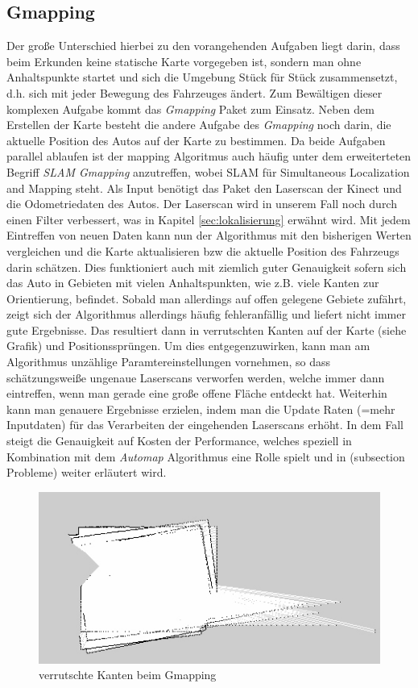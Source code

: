 \subsection{Gmapping}
\label{subsec:gmapping}
Der große Unterschied hierbei zu den vorangehenden Aufgaben liegt darin, dass beim Erkunden keine statische Karte vorgegeben ist, sondern man ohne Anhaltspunkte startet und sich die Umgebung Stück für Stück zusammensetzt, d.h. sich mit jeder Bewegung des Fahrzeuges ändert. Zum Bewältigen dieser komplexen Aufgabe kommt das \textit{Gmapping} Paket zum Einsatz. Neben dem Erstellen der Karte besteht die andere Aufgabe des \textit{Gmapping} noch darin, die aktuelle Position des Autos auf der Karte zu bestimmen. Da beide Aufgaben parallel ablaufen ist der mapping Algoritmus auch häufig unter dem erweiterteten Begriff \textit{SLAM Gmapping} anzutreffen, wobei SLAM für Simultaneous Localization and Mapping steht. Als Input benötigt das Paket den Laserscan der Kinect und die Odometriedaten des Autos. Der Laserscan wird in unserem Fall noch durch einen Filter verbessert, was in Kapitel \ref{sec:lokalisierung} erwähnt wird. Mit jedem Eintreffen von neuen Daten kann nun der Algorithmus mit den bisherigen Werten vergleichen und die Karte aktualisieren bzw die aktuelle Position des Fahrzeugs darin schätzen. Dies funktioniert auch mit ziemlich guter Genauigkeit sofern sich das Auto in Gebieten mit vielen Anhaltspunkten, wie z.B. viele Kanten zur Orientierung, befindet. Sobald man allerdings auf offen gelegene Gebiete zufährt, zeigt sich der Algorithmus allerdings häufig fehleranfällig und liefert nicht immer gute Ergebnisse. Das resultiert dann in verrutschten Kanten auf der Karte (siehe Grafik) und Positionssprüngen. Um dies entgegenzuwirken, kann man am Algorithmus unzählige Paramtereinstellungen vornehmen, so dass schätzungsweiße ungenaue Laserscans verworfen werden, welche immer dann eintreffen, wenn man gerade eine große offene Fläche entdeckt hat. Weiterhin kann man genauere Ergebnisse erzielen, indem man die Update Raten (=mehr Inputdaten) für das Verarbeiten der eingehenden Laserscans erhöht. In dem Fall steigt die Genauigkeit auf Kosten der Performance, welches speziell in Kombination mit dem \textit{Automap} Algorithmus eine Rolle spielt und in (subsection Probleme) weiter erläutert wird. 
\begin{figure}[h]
  \centering
     \includegraphics[width=1.0\textwidth]{Includes/gmap.jpg}
  \caption{verrutschte Kanten beim Gmapping}
  \label{fig:gmap}
\end{figure}

